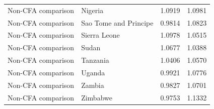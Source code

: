 \begin{table}
\begin{tabular}[t]{llrr}
Non-CFA comparison & Nigeria & 1.0919 & 1.0981\\
Non-CFA comparison & Sao Tome and Principe & 0.9814 & 1.0823\\
Non-CFA comparison & Sierra Leone & 1.0978 & 1.0515\\
\addlinespace
Non-CFA comparison & Sudan & 1.0677 & 1.0388\\
Non-CFA comparison & Tanzania & 1.0406 & 1.0570\\
Non-CFA comparison & Uganda & 0.9921 & 1.0776\\
Non-CFA comparison & Zambia & 0.9827 & 1.0701\\
Non-CFA comparison & Zimbabwe & 0.9753 & 1.1332\\
\bottomrule
\end{tabular}
\end{table}